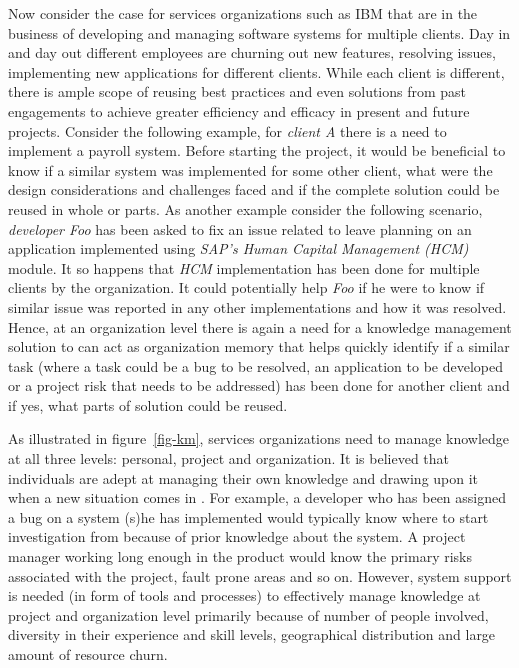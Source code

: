 Now consider the case for services organizations such as IBM that are in the business of developing and managing software systems for multiple clients. Day in and day out different employees are churning out new features, resolving issues, implementing new applications for different clients. While each client is different, there is ample scope of reusing best practices and even solutions from past engagements to achieve greater efficiency and efficacy in present and future projects. Consider the following example, for \textit{client A} there is a need to implement a payroll system. Before starting the project, it would be beneficial to know if a similar system was implemented for some other client, what were the design considerations and challenges faced and if the complete solution could be reused in whole or parts. As another example consider the following scenario, \textit{developer Foo} has been asked to fix an issue related to leave planning on an application implemented using \textit{SAP's Human Capital Management (HCM)} module. It so happens that \textit{HCM} implementation has been done for multiple clients by the organization. It could potentially help \textit{Foo} if he were to know if similar issue was reported in any other implementations and how it was resolved. Hence, at an organization level there is again a need for a knowledge management solution to can act as organization memory \cite{Stein:1995} that helps quickly identify if a similar task (where a task could be a bug to be resolved, an application to be developed or a project risk that needs to be addressed) has been done for another client and if yes, what parts of solution could be reused.

As illustrated in figure~\ref{fig-km}, services organizations need to manage knowledge at all three levels: personal, project and organization. It is believed that individuals are adept at managing their own knowledge and drawing upon it when a new situation comes in \cite{Bruce:2005}. For example, a developer who has been assigned a bug on a system (s)he has implemented would typically know where to start investigation from because of prior knowledge about the system. A project manager working long enough in the product would know the primary risks associated with the project, fault prone areas and so on. However, system support is needed (in form of tools and processes) to effectively manage knowledge at project and organization level primarily because of number of people involved, diversity in their experience and skill levels, geographical distribution and large amount of resource churn.  

